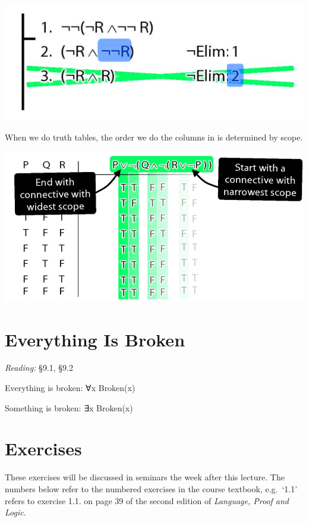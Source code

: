 \documentclass[12pt]{extarticle}
\begin{document}
\begin{multicols*}{3}
\begin{center}
\includegraphics[scale=0.3]{img/unit_290_scope_proof.png}
\end{center}
When we do truth tables, the order we do the columns in is determined by scope.
 
\begin{center}
\includegraphics[scale=0.3]{img/unit_290_scope_tt.png}
\end{center}
 
 
\section{Everything Is Broken}
 
\emph{Reading:} §9.1, §9.2
 
Everything is broken: ∀x Broken(x)
 
Something is broken: ∃x Broken(x)
 
\vfill
\begin{minipage}{\columnwidth}
\section{Exercises}
These exercises will be discussed in seminars the week after this lecture.
The numbers below refer to the numbered exercises in the course textbook, e.g.\ `1.1' refers to exercise 1.1. on page 39 of the second edition of \emph{Language, Proof and Logic}.
 

\end{minipage}
\end{multicols*}
\end{document}
